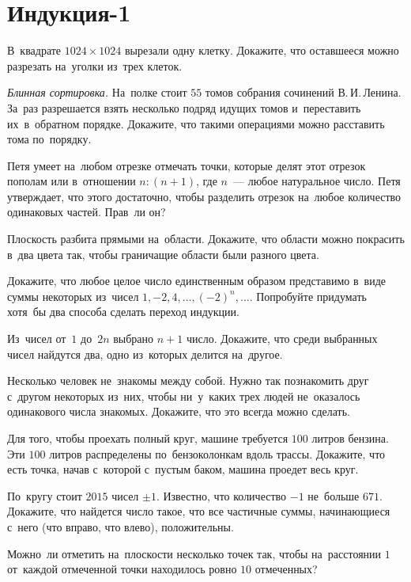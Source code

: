 
\section*{Индукция-1}


\begin{problems}

\item
В~квадрате $1024 \times 1024$ вырезали одну клетку.
Докажите, что оставшееся можно разрезать на~уголки из~трех клеток.

\item\emph{Блинная сортировка.}
На~полке стоит $55$ томов собрания сочинений В.\,И.\,Ленина.
За~раз разрешается взять несколько подряд идущих томов и~переставить
их~в~обратном порядке.
Докажите, что такими операциями можно расставить тома по~порядку.

\item
Петя умеет на~любом отрезке отмечать точки, которые делят этот отрезок пополам
или в~отношении $n : (n + 1)$, где $n$~--- любое натуральное число.
Петя утверждает, что этого достаточно, чтобы разделить отрезок на~любое
количество одинаковых частей.
Прав~ли он?

\item
Плоскость разбита прямыми на~области.
Докажите, что области можно покрасить в~два цвета так, чтобы граничащие области
были разного цвета.

\item
Докажите, что любое целое число единственным образом представимо в~виде суммы
некоторых из~чисел $1, -2, 4, \ldots, (-2)^n, \ldots$.
Попробуйте придумать хотя~бы два способа сделать переход индукции.

\item
Из~чисел от~$1$ до~$2n$ выбрано $n + 1$ число.
Докажите, что среди выбранных чисел найдутся два, одно из~которых делится на~другое.

\item
Несколько человек не~знакомы между собой.
Нужно так познакомить друг с~другом некоторых из~них, чтобы ни~у~каких трех
людей не~оказалось одинакового числа знакомых.
Докажите, что это всегда можно сделать.

\item
Для того, чтобы проехать полный круг, машине требуется $100$ литров бензина.
Эти $100$ литров распределены по~бензоколонкам вдоль трассы.
Докажите, что есть точка, начав с~которой с~пустым баком, машина проедет весь
круг.

\item
По~кругу стоит $2015$ чисел $\pm 1$.
Известно, что количество $-1$ не~больше $671$.
Докажите, что найдется число такое, что все частичные суммы, начинающиеся с~него (что вправо, что влево), положительны.

\item
Можно~ли отметить на~плоскости несколько точек так, чтобы на~расстоянии $1$ от~каждой отмеченной точки находилось ровно $10$ отмеченных?

\end{problems}

